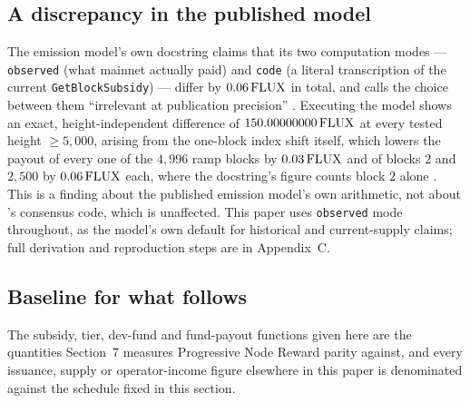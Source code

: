 \subsection{A discrepancy in the published model}
\label{sec:mp-discrepancy}

The emission model's own docstring claims that its two computation modes — \texttt{observed}
(what mainnet actually paid) and \texttt{code} (a literal transcription of the current
\texttt{Get\allowbreak{}Block\allowbreak{}Subsidy}) — differ by $0.06\,\mathrm{FLUX}$ in total, and calls the choice between them
``irrelevant at publication precision'' .
Executing the model shows an exact, height-independent difference of $150.00000000\,\mathrm{FLUX}$ at every
tested height $\ge 5{,}000$, arising from the one-block index shift itself, which lowers the payout of
every one of the $4{,}996$ ramp blocks by $0.03\,\mathrm{FLUX}$ and of blocks $2$ and $2{,}500$ by $0.06\,\mathrm{FLUX}$
each, where the docstring's figure counts block $2$ alone
\shipped {}. This is a
finding about the published emission model's own arithmetic, not about \fluxd's consensus code,
which is unaffected. This paper uses \texttt{observed} mode throughout, as the model's own default
for historical and current-supply claims; full derivation and reproduction steps are in
Appendix~C.

\subsection{Baseline for what follows}

The subsidy, tier, dev-fund and fund-payout functions given here are the quantities Section~7
measures Progressive Node Reward parity against, and every issuance, supply or operator-income
figure elsewhere in this paper is denominated against the schedule fixed in this section.

\FloatBarrier

